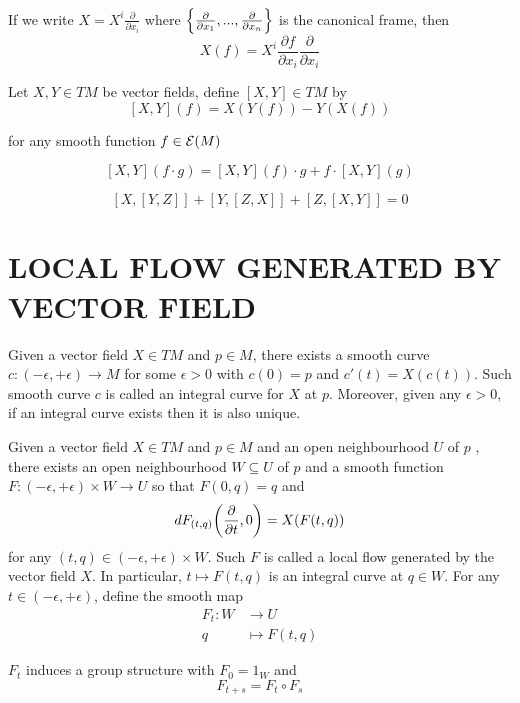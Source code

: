 \begin{remark}
	If we write $X = X^i \frac{\partial }{\partial x_i}$ where $\set*{\frac{\partial }{\partial x_1}, ..., \frac{\partial }{\partial x_n}}$ is the canonical frame, then 
	$$
		X(f) = X^i \frac{\partial f}{\partial x_i} \frac{\partial }{\partial x_i}
	$$
\end{remark}

\begin{definition}
	Let $X, Y \in TM$ be vector fields, define $[X, Y] \in TM$ by
	$$
		[X, Y](f) = X(Y(f)) - Y(X(f))
	$$
	
	for any smooth function $f \in \E(M)$
\end{definition}

\begin{remark}
	$$
		[X, Y](f \cdot g) = [X, Y](f) \cdot g + f \cdot [X, Y](g)
	$$
\end{remark}

\begin{proposition}
	$$
		[X, [Y, Z]] + [Y, [Z, X]] + [Z, [X, Y]] = 0
	$$
\end{proposition}

\section{LOCAL FLOW GENERATED BY VECTOR FIELD}

\begin{proposition}
	Given a vector field $X \in TM$ and $p \in M$, there exists a smooth curve $c: (-\epsilon, +\epsilon) \to M$ for some $\epsilon > 0$ with $c(0) = p$ and $c'(t) = X(c(t))$. Such smooth curve $c$ is called an integral curve for $X$ at $p$. Moreover, given any $\epsilon > 0$, if an integral curve exists then it is also unique.
\end{proposition}

\begin{proposition}
	Given a vector field $X \in TM$ and $p \in M$ and an open neighbourhood $U$ of $p$ , there exists an open neighbourhood $W \subseteq U$ of $p$ and a smooth function $F: (-\epsilon, +\epsilon) \times W \to U$ so that $F(0, q) = q$ and
	$$
		dF_{(t, q)} \tuple*{\frac{\partial}{\partial t}, 0} = X(F(t, q))
	$$
	for any $(t, q) \in (-\epsilon, +\epsilon) \times W$. Such $F$ is called a local flow generated by the vector field $X$. In particular, $t \mapsto F(t, q)$ is an integral curve at $q \in W$. For any $t \in (-\epsilon, +\epsilon)$, define the smooth map
	\begin{align*}
		F_t: W &\to U \\
				q &\mapsto F(t, q)
	\end{align*}
	
	$F_t$ induces a group structure with $F_0 = 1_W$ and
	$$
		F_{t + s} = F_t \circ F_s
	$$
\end{proposition}

